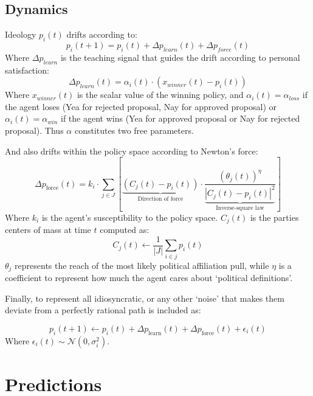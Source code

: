 \documentclass{article}
\begin{document}
	
	\subsection{Dynamics}
	
	Ideology $p_{i}(t)$ drifts according to:
	\begin{equation}
		p_{i}(t + 1) = p_{i}(t) + \Delta p_{learn}(t) + \Delta p_{force}(t)
	\end{equation}
	Where $\Delta p_{learn}$ is the teaching signal that guides the drift according to personal satisfaction:
	\begin{equation}
		\Delta p_{learn}(t) = \alpha_{i}(t) \cdot (x_{winner}(t) - p_{i}(t))
	\end{equation}
	Where $x_{winner}(t)$ is the scalar value of the winning policy, and $\alpha_{i}(t) = \alpha_{loss}$ if the agent loses (Yea for rejected proposal, Nay for approved proposal) or $\alpha_{i}(t) = \alpha_{win}$ if the agent wins (Yea for approved proposal or Nay for rejected proposal). Thus $\alpha$ constitutes two free parameters.
	
	And also drifts within the policy space according to Newton's force:
	\begin{equation}
		\Delta p_{\text{force}}(t) = k_i \cdot \sum_{j \in J} \left[ \underbrace{(C_j(t) - p_i(t))}_{\text{Direction of force}} \cdot \frac{(\theta_j(t))^\eta}{\underbrace{|C_j(t) - p_i(t)|^2}_{\text{Inverse-square law}}} \right]
	\end{equation}
	Where $k_{i}$ is the agent's susceptibility to the policy space. $C_{j}(t)$ is the parties centers of mass at time $t$ computed as:
	\begin{equation}
		C_j(t) \gets \frac{1}{|J|} \sum_{i \in j} p_i(t)
	\end{equation}
	$\theta_{j}$ represents the reach of the most likely political affiliation pull, while $\eta$ is a coefficient to represent how much the agent cares about `political definitions'.
	
	Finally, to represent all idiosyncratic, or any other `noise' that makes them deviate from a perfectly rational path is included as:
	
	\begin{equation}
		p_i(t+1) \gets p_i(t) + \Delta p_{\text{learn}}(t) + \Delta p_{\text{force}}(t) + \epsilon_{i}(t)
	\end{equation}
	Where $\epsilon_{i}(t) \sim \mathcal{N}(0, \sigma_{i}^{2})$.
	
	
	\section{Predictions}
	
\end{document}
